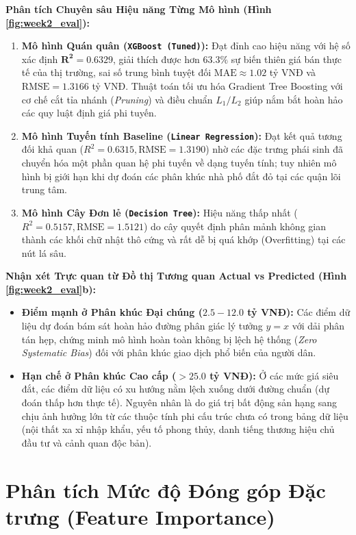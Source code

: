 \documentclass[12pt,a4paper]{report}
\begin{document}
\textbf{Phân tích Chuyên sâu Hiệu năng Từng Mô hình (Hình \ref{fig:week2_eval}):}
\begin{enumerate}[leftmargin=1.5em]
    \item \textbf{Mô hình Quán quân (\texttt{XGBoost (Tuned)}):} Đạt đỉnh cao hiệu năng với hệ số xác định $\mathbf{R^2 = 0.6329}$, giải thích được hơn $63.3\%$ sự biến thiên giá bán thực tế của thị trường, sai số trung bình tuyệt đối $\text{MAE} \approx 1.02$ tỷ VNĐ và $\text{RMSE} = 1.3166$ tỷ VNĐ. Thuật toán tối ưu hóa Gradient Tree Boosting với cơ chế cắt tỉa nhánh (\textit{Pruning}) và điều chuẩn $L_1/L_2$ giúp nắm bắt hoàn hảo các quy luật định giá phi tuyến.
    \item \textbf{Mô hình Tuyến tính Baseline (\texttt{Linear Regression}):} Đạt kết quả tương đối khả quan ($R^2 = 0.6315, \text{RMSE} = 1.3190$) nhờ các đặc trưng phái sinh đã chuyển hóa một phần quan hệ phi tuyến về dạng tuyến tính; tuy nhiên mô hình bị giới hạn khi dự đoán các phân khúc nhà phố đắt đỏ tại các quận lõi trung tâm.
    \item \textbf{Mô hình Cây Đơn lẻ (\texttt{Decision Tree}):} Hiệu năng thấp nhất ($R^2 = 0.5157, \text{RMSE} = 1.5121$) do cây quyết định phân mảnh không gian thành các khối chữ nhật thô cứng và rất dễ bị quá khớp (Overfitting) tại các nút lá sâu.
\end{enumerate}

\textbf{Nhận xét Trực quan từ Đồ thị Tương quan Actual vs Predicted (Hình \ref{fig:week2_eval}b):}
\begin{itemize}[leftmargin=1.5em]
    \item \textbf{Điểm mạnh ở Phân khúc Đại chúng ($2.5 - 12.0$ tỷ VNĐ):} Các điểm dữ liệu dự đoán bám sát hoàn hảo đường phân giác lý tưởng $y = x$ với dải phân tán hẹp, chứng minh mô hình hoàn toàn không bị lệch hệ thống (\textit{Zero Systematic Bias}) đối với phân khúc giao dịch phổ biến của người dân.
    \item \textbf{Hạn chế ở Phân khúc Cao cấp ($> 25.0$ tỷ VNĐ):} Ở các mức giá siêu đắt, các điểm dữ liệu có xu hướng nằm lệch xuống dưới đường chuẩn (dự đoán thấp hơn thực tế). Nguyên nhân là do giá trị bất động sản hạng sang chịu ảnh hưởng lớn từ các thuộc tính phi cấu trúc chưa có trong bảng dữ liệu (nội thất xa xỉ nhập khẩu, yếu tố phong thủy, danh tiếng thương hiệu chủ đầu tư và cảnh quan độc bản).
\end{itemize}

\section{Phân tích Mức độ Đóng góp Đặc trưng (Feature Importance)}
\end{document}
